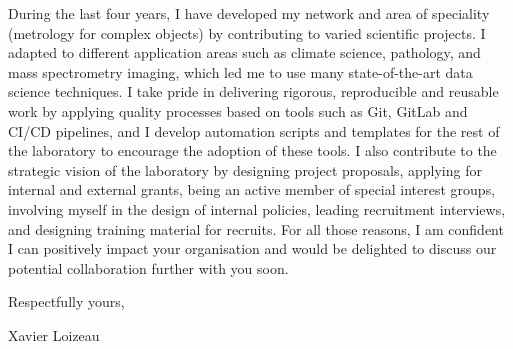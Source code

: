 \documentclass[12pt]{article}
\begin{document}
\medskip

During the last four years, I have developed my network and area of speciality (metrology for complex objects) by contributing to varied scientific projects.
I adapted to different application areas such as climate science, pathology, and mass spectrometry imaging, which led me to use many state-of-the-art data science techniques.
I take pride in delivering rigorous, reproducible and reusable work by applying quality processes based on tools such as Git, GitLab and CI/CD pipelines, and I develop automation scripts and templates for the rest of the laboratory to encourage the adoption of these tools.
I also contribute to the strategic vision of the laboratory by designing project proposals, applying for internal and external grants, being an active member of special interest groups, involving myself in the design of internal policies, leading recruitment interviews, and designing training material for recruits.
For all those reasons, I am confident I can positively impact your organisation and would be delighted to discuss our potential collaboration further with you soon.

\medskip

Respectfully yours,

Xavier Loizeau

\vfill%
\end{document}
